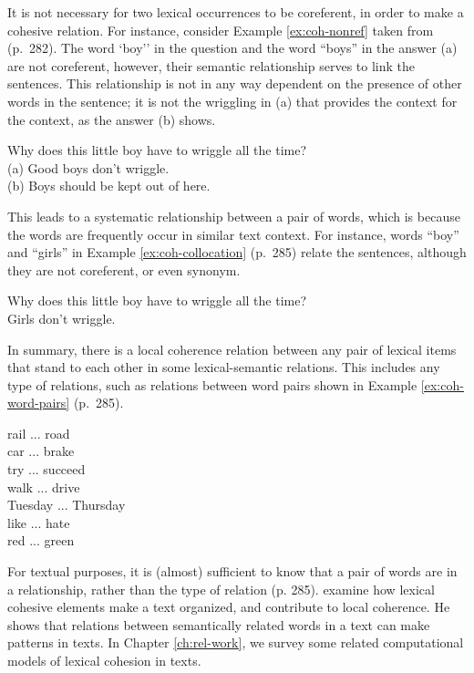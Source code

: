 It is not necessary for two lexical occurrences to be coreferent, in order to make a cohesive relation.  
For instance, consider Example \ref{ex:coh-nonref} taken from (p.~282). 
The word `boy'' in the question and the word ``boys'' in the answer (a) are not coreferent, however, their semantic relationship serves to link the sentences. 
This relationship is not in any way dependent on the presence of other words in the sentence; it is not the wriggling in (a) that provides the context for the context, as the answer (b) shows. 

\begin{examples}
	\label{ex:coh-nonref}
	Why does this little boy have to wriggle all the time? \\
	(a) Good boys don't wriggle. \\
	(b) Boys should be kept out of here. \\
\end{examples} 

This leads to a systematic relationship between a pair of words, which is because the words are frequently occur in similar text context. 
For instance, words ``boy'' and ``girls'' in Example \ref{ex:coh-collocation} \cite{halliday76}(p.~285) relate the sentences, although they are not coreferent, or even synonym. 

\begin{examples}
	\label{ex:coh-collocation}
	Why does this little boy have to wriggle all the time? \\
	Girls don't wriggle. 
\end{examples}

In summary, there is a local coherence relation between any pair of lexical items that stand to each other in some lexical-semantic relations. 
This includes any type of relations, such as relations between word pairs shown in Example \ref{ex:coh-word-pairs} \cite{halliday76} (p.~285). 

\begin{examples}
	\label{ex:coh-word-pairs}
	rail ... road \\
	car ... brake \\
	try ... succeed \\
	walk ... drive \\
	Tuesday ... Thursday \\
	like ... hate \\
	red ... green 
\end{examples}

For textual purposes, it is (almost) sufficient to know that a pair of words are in a relationship, rather than the type of relation \cite{halliday76} (p. 285).  
 examine how lexical cohesive elements make a text organized, and contribute to local coherence. 
He shows that relations between semantically related words in a text can make patterns in texts. 
In Chapter \ref{ch:rel-work}, we survey some related computational models of lexical cohesion in texts. 


